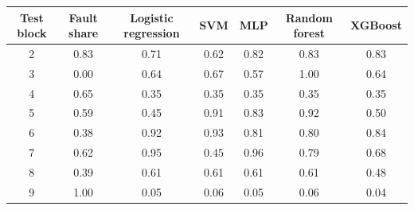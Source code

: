 \begin{tabular}{ccccccc}
\toprule
Test block & Fault share & Logistic regression & SVM & MLP & Random forest & XGBoost \\
\midrule
2 & 0.83 & 0.71 & 0.62 & 0.82 & 0.83 & 0.83 \\
3 & 0.00 & 0.64 & 0.67 & 0.57 & 1.00 & 0.64 \\
4 & 0.65 & 0.35 & 0.35 & 0.35 & 0.35 & 0.35 \\
5 & 0.59 & 0.45 & 0.91 & 0.83 & 0.92 & 0.50 \\
6 & 0.38 & 0.92 & 0.93 & 0.81 & 0.80 & 0.84 \\
7 & 0.62 & 0.95 & 0.45 & 0.96 & 0.79 & 0.68 \\
8 & 0.39 & 0.61 & 0.61 & 0.61 & 0.61 & 0.48 \\
9 & 1.00 & 0.05 & 0.06 & 0.05 & 0.06 & 0.04 \\
\bottomrule
\end{tabular}
